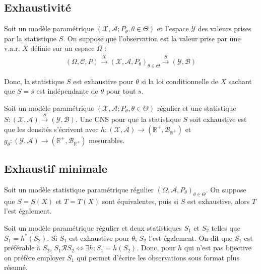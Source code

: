 \documentclass[10pt, french]{report}
\begin{document}
\begin{multicols*}{2}
\section{Exhaustivité}
\begin{definitionNOHFILL}[Exhaustivité]
Soit un modèle paramétrique $(\mathcal{X}, \mathcal{A}; P_{\theta}, \theta \in \Theta)$ et l'espace $\mathcal{Y}$ des valeurs prises par la statistique $S$. On suppose que l'observation est la valeur prise par une v.a.r. $X$ définie sur un espace $\Omega$ :
\begin{align*}
	(\Omega, \mathcal{C}, P) \overset{X}{\longrightarrow} (\mathcal{X}, \mathcal{A}, P_{\theta})_{\theta \in \Theta} \overset{S}{\longrightarrow} (\mathcal{Y}, \mathcal{B})
\end{align*}

Donc, la statistique $S$ est exhaustive pour $\theta$ si la loi conditionnelle de $X$ sachant que $S = s$ est indépendante de $\theta$ pour tout $s$.
\end{definitionNOHFILL}

\begin{definitionNOHFILLsub}
Soit un modèle paramétrique $(\mathcal{X}, \mathcal{A}; P_{\theta}, \theta \in \Theta)$ régulier et une statistique $S: (\mathcal{X}, \mathcal{A}) \overset{S}{\longrightarrow} (\mathcal{Y}, \mathcal{B})$. Une CNS pour que la statistique $S$ soit exhaustive est que les densités s'écrivent  avec $h: (\mathcal{X}, \mathcal{A}) \longrightarrow (\mathbb{R}^{+}, \mathcal{B}_{\mathbb{R}^{+}})$ et $g_{\theta}: (\mathcal{Y}, \mathcal{A}) \longrightarrow (\mathbb{R}^{+}, \mathcal{B}_{\mathbb{R}^{+}})$ mesurables.
\end{definitionNOHFILLsub}



\subsection{Exhaustif minimale}
Soit un modèle statistique paramétrique régulier $(\Omega, \mathcal{A}, P_{\theta})_{\theta \in \Theta}$. On suppose que $S = S(X)$ et $T = T(X)$ sont équivalentes, puis si $S$ est exhaustive, alors $T$ l'est également.  

\bigskip

Soit un modèle paramétrique régulier et deux statistiques $S_{1}$ et $S_{2}$ telles que $S_{1} = h^{\ast}(S_{2})$. Si $S_{1}$ est exhaustive pour $\theta$, $S_{2}$ l'est également. On dit que $S_{1}$ est préférable à $S_{2}$, $S_{1} \mathcal{R} S_{2} \Leftrightarrow \exists h: S_{1} = h(S_{2})$. Donc, pour $h$ qui n'est pas bijective on préfère employer $S_{1}$ qui permet d'écrire les observations sous format plus résumé.


\end{multicols*}
\end{document}
